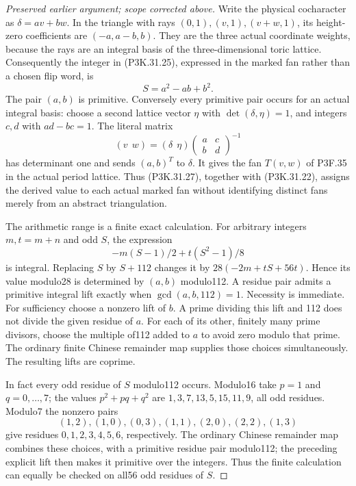 \begin{proof}[Preserved earlier argument; scope corrected above]
Write the physical cocharacter as
\(\delta=a v+b w\). In the triangle with rays
\((0,1),(v,1),(v+w,1)\), its height-zero coefficients
are \((-a,a-b,b)\). They are the three actual
coordinate weights, because the rays are an integral
basis of the three-dimensional toric lattice.
Consequently the integer in (P3K.31.25), expressed in the
marked fan rather than a chosen flip word, is
\[
                         S=a^2-ab+b^2.
                                                        \tag{P3K.31.27}
\]
The pair \((a,b)\) is primitive. Conversely every
primitive pair occurs for an actual integral basis:
choose a second lattice vector \(\eta\) with
\(\det(\delta,\eta)=1\), and integers \(c,d\) with
\(ad-bc=1\). The literal matrix
\[
       (v\ \ w)=(\delta\ \ \eta)
                        \begin{pmatrix}a&c\\b&d\end{pmatrix}^{-1}
\]
has determinant one and sends \((a,b)^T\) to \(\delta\).
It gives the fan \(T(v,w)\) of P3F.35 in the actual
period lattice.
Thus (P3K.31.27), together with (P3K.31.22), assigns the
derived value to each actual marked fan
without identifying distinct fans merely from an
abstract triangulation.

The arithmetic range is a finite exact calculation.
For arbitrary integers \(m,t=m+n\) and odd \(S\),
the expression
\[
                  -m(S-1)/2+t(S^2-1)/8
\]
is integral. Replacing \(S\) by \(S+112\) changes it
by \(28(-2m+tS+56t)\). Hence its value modulo28 is
determined by \((a,b)\) modulo112.
A residue pair admits a primitive integral lift
exactly when \(\gcd(a,b,112)=1\). Necessity is
immediate. For sufficiency choose a nonzero lift
of \(b\). A prime dividing this lift and 112 does
not divide the given residue of \(a\). For each
of its other, finitely many prime divisors, choose
the multiple of112 added to \(a\) to avoid zero
modulo that prime. The ordinary finite Chinese
remainder map supplies those choices simultaneously.
The resulting lifts are coprime.

In fact every odd residue of \(S\) modulo112 occurs.
Modulo16 take \(p=1\) and \(q=0,\ldots,7\); the
values \(p^2+pq+q^2\) are
\(1,3,7,13,5,15,11,9\), all odd residues.
Modulo7 the nonzero pairs
\[
 (1,2),(1,0),(0,3),(1,1),(2,0),(2,2),(1,3)
\]
give residues \(0,1,2,3,4,5,6\), respectively.
The ordinary Chinese remainder map combines these
choices, with a primitive residue pair modulo112;
the preceding explicit lift then makes it primitive
over the integers. Thus the finite calculation can
equally be checked on all56 odd residues of \(S\).


\end{proof}
